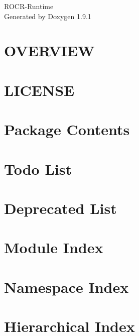 \let\mypdfximage\pdfximage\def\pdfximage{\immediate\mypdfximage}\documentclass[twoside]{book}
\newcommand{\+}{\discretionary{\mbox{\scriptsize$\hookleftarrow$}}{}{}}
\newcommand{\clearemptydoublepage}{%
  \newpage{\pagestyle{empty}\cleardoublepage}%
}
\begin{document}
\raggedbottom

\hypersetup{pageanchor=false,
             bookmarksnumbered=true,
             pdfencoding=unicode
            }
\begin{titlepage}
\vspace*{7cm}
\begin{center}%
{\Large ROCR-\/\+Runtime }\\
\vspace*{1cm}
{\large Generated by Doxygen 1.9.1}\\
\end{center}
\end{titlepage}
\clearemptydoublepage
{}
\tableofcontents
\clearemptydoublepage
{}
\hypersetup{pageanchor=true}

\chapter{OVERVIEW}
\label{md_src_image_blit_src_README}

\chapter{LICENSE}
\label{md_src_LICENSE}

\chapter{Package Contents}
\label{md_src_README}

\chapter{Todo List}
\label{todo}

\chapter{Deprecated List}
\label{deprecated}

\chapter{Module Index}

\chapter{Namespace Index}

\chapter{Hierarchical Index}

\end{document}
